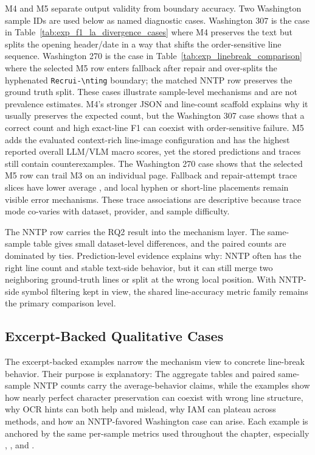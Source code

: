 M4 and M5 separate output validity from boundary accuracy. Two Washington sample IDs are used below as named diagnostic cases. Washington 307 is the case in Table~\ref{tab:exp_f1_la_divergence_cases} where M4 preserves the text but splits the opening header/date in a way that shifts the order-sensitive line sequence. Washington 270 is the case in Table~\ref{tab:exp_linebreak_comparison} where the selected M5 row enters fallback after repair and over-splits the hyphenated \texttt{Recrui-\textbackslash nting} boundary; the matched NNTP row preserves the ground truth split. These cases illustrate sample-level mechanisms and are not prevalence estimates. M4's stronger JSON and line-count scaffold explains why it usually preserves the expected count, but the Washington 307 case shows that a correct count and high exact-line F1 can coexist with order-sensitive failure. M5 adds the evaluated context-rich line-image configuration and has the highest reported overall LLM/VLM macro scores, yet the stored predictions and traces still contain counterexamples. The Washington 270 case shows that the selected M5 row can trail M3 on an individual page. Fallback and repair-attempt trace slices have lower average \LANormCombined{}, and local hyphen or short-line placements remain visible error mechanisms. These trace associations are descriptive because trace mode co-varies with dataset, provider, and sample difficulty.

The NNTP row carries the RQ2 result into the mechanism layer. The same-sample table gives small dataset-level differences, and the paired counts are dominated by ties. Prediction-level evidence explains why: NNTP often has the right line count and stable text-side behavior, but it can still merge two neighboring ground-truth lines or split at the wrong local position. With NNTP-side symbol filtering kept in view, the shared line-accuracy metric family remains the primary comparison level.

\FloatBarrier

\subsection{Excerpt-Backed Qualitative Cases}
\label{sec:experimentation_qualitative_cases}

The excerpt-backed examples narrow the mechanism view to concrete line-break behavior. Their purpose is explanatory: The aggregate tables and paired same-sample NNTP counts carry the average-behavior claims, while the examples show how nearly perfect character preservation can coexist with wrong line structure, why OCR hints can both help and mislead, why IAM can plateau across methods, and how an NNTP-favored Washington case can arise. Each example is anchored by the same per-sample metrics used throughout the chapter, especially \LANormCombined, \LineFOneNorm, and \CERNorm.


